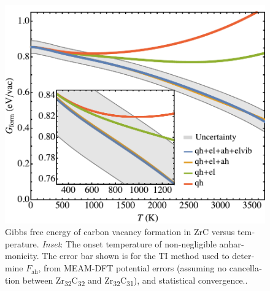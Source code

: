 \documentclass[twocolumn,american,aps,prb,showpacs,showkeys,amsmath,amssymb,superscriptaddress,a4]{revtex4-1}
\begin{document}
\begin{figure}[h]
\begin{centering}
\includegraphics[scale=0.55]{Fig6_gFormWithInset}
\par\end{centering}
\caption{\foreignlanguage{american}{Gibbs free energy of carbon vacancy formation in ZrC versus temperature.
\emph{Inset}: The onset temperature of non-negligible anharmonicity.  The error bar shown is for the TI method used to determine $F_\text{ah}$, from MEAM-DFT potential errors (assuming no cancellation between Zr\textsubscript{32}C\textsubscript{32} and  Zr\textsubscript{32}C\textsubscript{31}), and statistical convergence..
\label{fig: gFormWithInset}}}
\end{figure}
\end{document}
